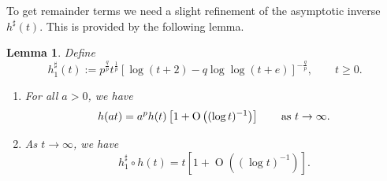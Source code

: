 \documentclass[10pt, a4paper]{amsart}
\newcommand{\op}{\operatorname}
\numberwithin{equation}{section}
\newtheorem{lemma}[theorem]{Lemma}
\theoremstyle{definition}
\theoremstyle{remark}
\begin{document}
To get remainder terms we need a slight refinement of the asymptotic inverse $h^\sharp(t)$. This is provided by the following lemma.

\begin{lemma}\label{lem:app.h1sharp}
 Define
 \begin{equation*}
 h_1^\sharp(t):=p^{\frac{q}{p}} t^{\frac{1}{p}}\left[\log(t+2) - q\log \log (t+e)\right]^{-\frac{q}{p}}, \qquad t\geq 0.
\end{equation*}
\begin{enumerate}
 \item[(i)] For all $a>0$, we have
 \begin{equation*}
 h(at)=a^p h(t) \left[ 1+ \op{O}\left((\log t)^{-1}\right) \right]  \qquad \textup{as}\ t\rightarrow \infty.
\end{equation*}

\item[(ii)] As $t\rightarrow \infty$, we have
\begin{equation}\label{eq:adjustment of asymptotic inverse}
 h_1^\sharp \circ h(t)=t \left[ 1+ \op{O}\left((\log t)^{-1}\right) \right] .
\end{equation}
\end{enumerate}
\end{lemma}
\end{document}
